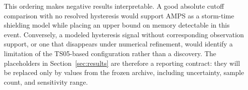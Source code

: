 This ordering makes negative results interpretable. A good absolute cutoff
comparison with no resolved hysteresis would support AMPS as a storm-time
shielding model while placing an upper bound on memory detectable in this
event. Conversely, a modeled hysteresis signal without corresponding
observation support, or one that disappears under numerical refinement, would
identify a limitation of the TS05-based configuration rather than a discovery.
The placeholders in Section~\ref{sec:results} are therefore a reporting
contract: they will be replaced only by values from the frozen archive,
including uncertainty, sample count, and sensitivity range.
